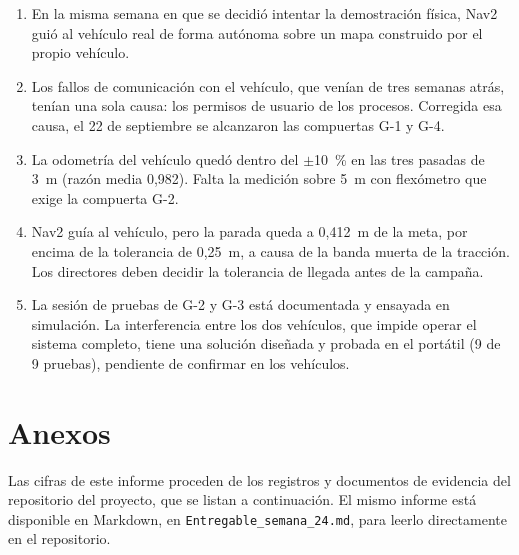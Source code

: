 \documentclass[12pt,letterpaper]{article}
\begin{document}
\begin{enumerate}[leftmargin=*]
    \item En la misma semana en que se decidió intentar la demostración física, Nav2 guió al vehículo real de forma autónoma sobre un mapa construido por el propio vehículo.
    \item Los fallos de comunicación con el vehículo, que venían de tres semanas atrás, tenían una sola causa: los permisos de usuario de los procesos. Corregida esa causa, el 22 de septiembre se alcanzaron las compuertas G-1 y G-4.
    \item La odometría del vehículo quedó dentro del $\pm$10~\% en las tres pasadas de 3~m (razón media 0,982). Falta la medición sobre 5~m con flexómetro que exige la compuerta G-2.
    \item Nav2 guía al vehículo, pero la parada queda a 0,412~m de la meta, por encima de la tolerancia de 0,25~m, a causa de la banda muerta de la tracción. Los directores deben decidir la tolerancia de llegada antes de la campaña.
    \item La sesión de pruebas de G-2 y G-3 está documentada y ensayada en simulación. La interferencia entre los dos vehículos, que impide operar el sistema completo, tiene una solución diseñada y probada en el portátil (9 de 9 pruebas), pendiente de confirmar en los vehículos.
\end{enumerate}

\section{Anexos}

Las cifras de este informe proceden de los registros y documentos de evidencia del repositorio del proyecto, que se listan a continuación. El mismo informe está disponible en Markdown, en \texttt{Entregable\_semana\_24.md}, para leerlo directamente en el repositorio.
\end{document}
